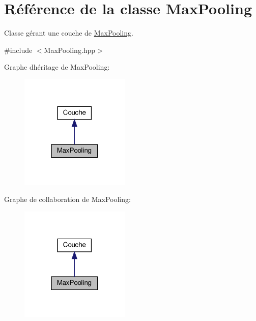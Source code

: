 \hypertarget{class_max_pooling}{}\section{Référence de la classe Max\+Pooling}
\label{class_max_pooling}


Classe gérant une couche de \hyperlink{class_max_pooling}{Max\+Pooling}.  




{\ttfamily \#include $<$Max\+Pooling.\+hpp$>$}



Graphe d\textquotesingle{}héritage de Max\+Pooling\+:\nopagebreak
\begin{figure}[H]
\begin{center}
\leavevmode
\includegraphics[width=148pt]{class_max_pooling__inherit__graph}
\end{center}
\end{figure}


Graphe de collaboration de Max\+Pooling\+:\nopagebreak
\begin{figure}[H]
\begin{center}
\leavevmode
\includegraphics[width=148pt]{class_max_pooling__coll__graph}
\end{center}
\end{figure}
